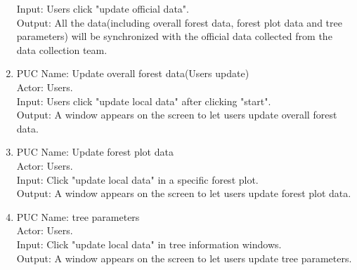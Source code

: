 \documentclass{article}
\begin{document}
\begin{enumerate}
    Input: Users click "update official data".\\
    Output: All the data(including overall forest data, forest plot data and tree 
    parameters) will be synchronized with the official data collected from the 
    data collection team.
    \item PUC Name: Update overall forest data(Users update)\\
    Actor: Users.\\
    Input: Users click "update local data" after clicking "start".\\
    Output: A window appears on the screen to let users update overall
    forest data.
    \item PUC Name: Update forest plot data\\
    Actor: Users.\\
    Input: Click "update local data" in a specific forest plot.\\
    Output:  A window appears on the screen to let users update
    forest plot data.
    \item PUC Name: tree parameters\\
    Actor: Users.\\
    Input: Click "update local data" in tree information windows.\\
    Output:  A window appears on the screen to let users update tree 
    parameters.
\end{enumerate}
\end{document}
